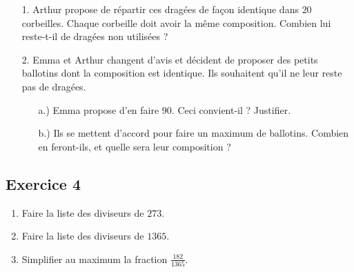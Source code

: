\documentclass[14 pt]{extarticle}
\theoremstyle{plain}
\begin{document}
 \begin{enumerate}
 \item[1.] Arthur propose de répartir ces dragées de
 façon identique dans $20$ corbeilles. 
 Chaque corbeille doit avoir la même composition. Combien lui reste-t-il de dragées non utilisées ? 
 \item[2.] Emma et Arthur changent d'avis et décident de proposer des petits ballotins dont la composition est identique. Ils souhaitent qu'il ne leur reste pas de dragées. \begin{enumerate}
 \item[a.)] Emma propose d'en faire $90$. Ceci convient-il ? Justifier. 
 \item[b.)] Ils se mettent d'accord pour faire un maximum de ballotins. Combien en feront-ils, et quelle sera leur composition ? 
 \end{enumerate}
 \end{enumerate}
 
 \subsection*{Exercice 4}
 
 \begin{enumerate}
 \item Faire la liste des diviseurs de $273$. 
 \item Faire la liste des diviseurs de $1365$.
 \item Simplifier au maximum la fraction $\frac{182}{1365}$. 
 \end{enumerate}
 
 
 	
\end{document}
